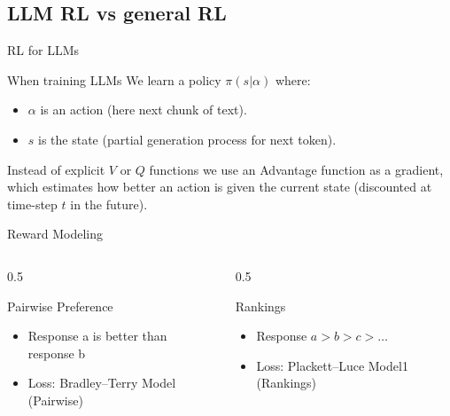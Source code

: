\documentclass[24pt]{beamer}
\newcommand{\subsectionslide}{
	\begin{frame}
		\sectionpage
		\subsectionpage
	\end{frame}
}
\begin{document}
\subsection{LLM RL vs general RL}
\subsectionslide

\begin{frame}{RL for LLMs}
	\begin{block}{When training LLMs}
		We learn a policy $\pi(s \lvert \alpha)$ where:
		\begin{itemize}
			\item $\alpha$ is an action (here next chunk of text).
			\item $s$ is the state (partial generation process for next token).
		\end{itemize}
		Instead of explicit $V$ or $Q$ functions we use an \alert{Advantage function} as a \alert{gradient}, which estimates how better an action is given the current state (discounted at time-step $t$  in the future).
	\end{block}
\end{frame}

\begin{frame}{Reward Modeling}
	\begin{columns}
		\begin{column}{0.5\textwidth}
			\begin{block}{Pairwise Preference}
				\begin{itemize}
					\item Response a is better than response b
					\item Loss: Bradley–Terry Model (Pairwise)
				\end{itemize}
			\end{block}
		\end{column}
		\begin{column}{0.5\textwidth}
			\begin{block}{Rankings}
				\begin{itemize}
					\item Response $a > b > c > \ldots$
					\item Loss: Plackett–Luce Model1 (Rankings)
				\end{itemize}
			\end{block}
		\end{column}
	\end{columns}
\end{frame}
\end{document}
